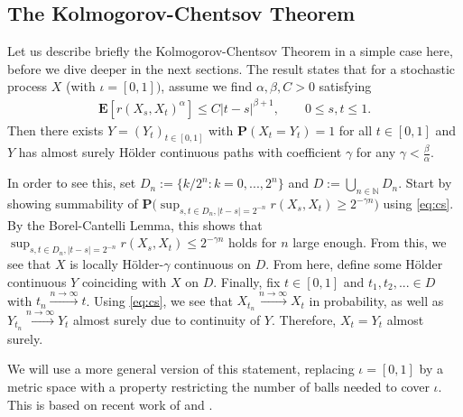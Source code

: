 \documentclass[lean]{Draft}
\begin{document}
\cite{hairer2009introduction}

\subsection{The Kolmogorov-Chentsov Theorem}
Let us describe briefly the Kolmogorov-Chentsov Theorem in a simple case here, before we dive deeper in the next sections. The result states that for a stochastic process $X$ (with $\iota = [0,1])$, assume we find $\alpha, \beta, C > 0$ satisfying
\begin{align}
\label{eq:cs}
  \mathbf E[r(X_s, X_t)^\alpha] \leq C|t-s|^{\beta + 1}, \qquad 0\leq s,t\leq 1.
\end{align}
Then there exists $Y = (Y_t)_{t\in [0,1]}$ with $\mathbf P(X_t = Y_t) = 1$ for all $t\in [0,1]$ and $Y$ has almost surely Hölder continuous paths with coefficient $\gamma$ for any $\gamma < \tfrac \beta \alpha$.

In order to see this, set $D_n := \{k/2^n: k=0,...,2^n\}$ and $D := \bigcup_{n\in\mathbb N} D_n$. Start by showing summability of $\mathbf P\Big( \sup_{s,t\in D_n, |t-s| = 2^{-n}} r(X_s, X_t) \geq 2^{-\gamma n} \Big)$ using \eqref{eq:cs}. By the Borel-Cantelli Lemma, this shows that $\sup_{s,t\in D_n, |t-s| = 2^{-n}} r(X_s, X_t) \leq 2^{-\gamma n}$ holds for $n$ large enough. From this, we see that $X$ is locally Hölder-$\gamma$ continuous on $D$. From here, define some Hölder continuous $Y$ coinciding with $X$ on $D$. Finally, fix $t \in [0,1]$ and $t_1, t_2,...\in D$ with $t_n \xrightarrow{n\to\infty} t$. Using \eqref{eq:cs}, we see that $X_{t_n} \xrightarrow{n\to\infty} X_t$ in probability, as well as $Y_{t_n} \xrightarrow{n\to\infty} Y_t$ almost surely due to continuity of $Y$. Therefore, $X_t = Y_t$ almost surely.

We will use a more general version of this statement, replacing $\iota = [0,1]$ by a metric space with a property restricting the number of balls needed to cover $\iota$. This is based on recent work of \cite{talagrand2022upper} and \cite{kratschmer2023kolmogorov}.
\end{document}
